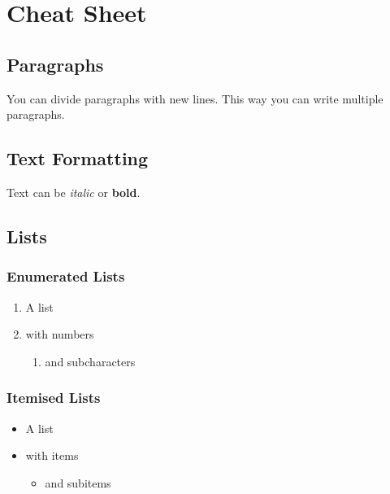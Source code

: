 \section{Cheat Sheet}
\label{sec:cheat_sheet}

\subsection{Paragraphs}
\label{ssec:paragraphs}

You can divide paragraphs with new lines.
\newline
This way you can write multiple paragraphs.

\subsection{Text Formatting}
\label{ssec:formatting}

Text can be \textit{italic} or \textbf{bold}.

\subsection{Lists}
\label{ssec:lists}

\subsubsection{Enumerated Lists}
\label{sssec:enum_lists}

\begin{enumerate}
    \item A list
    \item with numbers
    \begin{enumerate}
        \item and subcharacters
    \end{enumerate}
\end{enumerate}

\subsubsection{Itemised Lists}
\label{sssec:item_lists}

\begin{itemize}
    \item A list
    \item with items
    \begin{itemize}
        \item and subitems
    \end{itemize}
\end{itemize}

